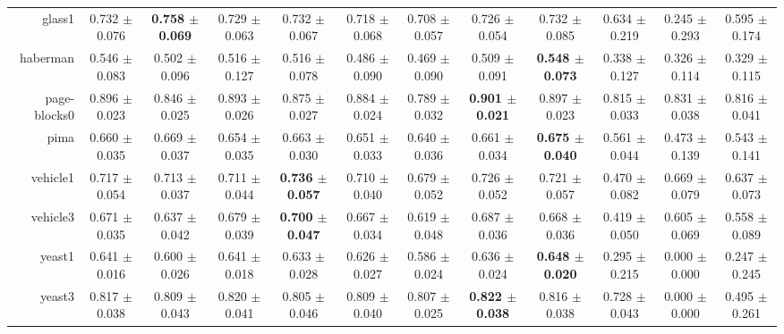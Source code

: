 \begin{table}[!ht]
{\begin{tabular}{r c c c c c c c c c c c}
glass1 & 0.732 $\pm$ 0.076 & \textbf{0.758 $\pm$ 0.069} & 0.729 $\pm$ 0.063 & 0.732 $\pm$ 0.067 & 0.718 $\pm$ 0.068 & 0.708 $\pm$ 0.057 & 0.726 $\pm$ 0.054 & 0.732 $\pm$ 0.085 & 0.634 $\pm$ 0.219 & 0.245 $\pm$ 0.293 & 0.595 $\pm$ 0.174 \\
haberman & 0.546 $\pm$ 0.083 & 0.502 $\pm$ 0.096 & 0.516 $\pm$ 0.127 & 0.516 $\pm$ 0.078 & 0.486 $\pm$ 0.090 & 0.469 $\pm$ 0.090 & 0.509 $\pm$ 0.091 & \textbf{0.548 $\pm$ 0.073} & 0.338 $\pm$ 0.127 & 0.326 $\pm$ 0.114 & 0.329 $\pm$ 0.115 \\
page-blocks0 & 0.896 $\pm$ 0.023 & 0.846 $\pm$ 0.025 & 0.893 $\pm$ 0.026 & 0.875 $\pm$ 0.027 & 0.884 $\pm$ 0.024 & 0.789 $\pm$ 0.032 & \textbf{0.901 $\pm$ 0.021} & 0.897 $\pm$ 0.023 & 0.815 $\pm$ 0.033 & 0.831 $\pm$ 0.038 & 0.816 $\pm$ 0.041 \\
pima & 0.660 $\pm$ 0.035 & 0.669 $\pm$ 0.037 & 0.654 $\pm$ 0.035 & 0.663 $\pm$ 0.030 & 0.651 $\pm$ 0.033 & 0.640 $\pm$ 0.036 & 0.661 $\pm$ 0.034 & \textbf{0.675 $\pm$ 0.040} & 0.561 $\pm$ 0.044 & 0.473 $\pm$ 0.139 & 0.543 $\pm$ 0.141 \\
vehicle1 & 0.717 $\pm$ 0.054 & 0.713 $\pm$ 0.037 & 0.711 $\pm$ 0.044 & \textbf{0.736 $\pm$ 0.057} & 0.710 $\pm$ 0.040 & 0.679 $\pm$ 0.052 & 0.726 $\pm$ 0.052 & 0.721 $\pm$ 0.057 & 0.470 $\pm$ 0.082 & 0.669 $\pm$ 0.079 & 0.637 $\pm$ 0.073 \\
vehicle3 & 0.671 $\pm$ 0.035 & 0.637 $\pm$ 0.042 & 0.679 $\pm$ 0.039 & \textbf{0.700 $\pm$ 0.047} & 0.667 $\pm$ 0.034 & 0.619 $\pm$ 0.048 & 0.687 $\pm$ 0.036 & 0.668 $\pm$ 0.036 & 0.419 $\pm$ 0.050 & 0.605 $\pm$ 0.069 & 0.558 $\pm$ 0.089 \\
yeast1 & 0.641 $\pm$ 0.016 & 0.600 $\pm$ 0.026 & 0.641 $\pm$ 0.018 & 0.633 $\pm$ 0.028 & 0.626 $\pm$ 0.027 & 0.586 $\pm$ 0.024 & 0.636 $\pm$ 0.024 & \textbf{0.648 $\pm$ 0.020} & 0.295 $\pm$ 0.215 & 0.000 $\pm$ 0.000 & 0.247 $\pm$ 0.245 \\
yeast3 & 0.817 $\pm$ 0.038 & 0.809 $\pm$ 0.043 & 0.820 $\pm$ 0.041 & 0.805 $\pm$ 0.046 & 0.809 $\pm$ 0.040 & 0.807 $\pm$ 0.025 & \textbf{0.822 $\pm$ 0.038} & 0.816 $\pm$ 0.038 & 0.728 $\pm$ 0.043 & 0.000 $\pm$ 0.000 & 0.495 $\pm$ 0.261 \\
\end{tabular}}
\end{table}
